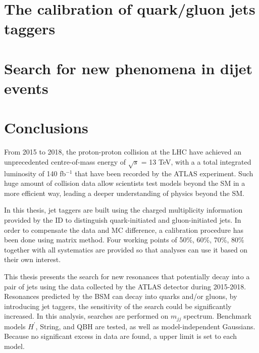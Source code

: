 \documentclass[UTF8,12pt]{ctexart}
\numberwithin{equation}{section}
\def\mjj{$m_{jj}$ }
\def\ifb{fb$^{-1}$ }
\def\Hprime{\ensuremath{H^\prime}}
\begin{document}
\newpage
{}
\section{The calibration of quark/gluon jets taggers}
\label{sec:5}



\newpage
{}
\section{Search for new phenomena in dijet events}
\label{sec:6}



\newpage
{}
\section{Conclusions}
\label{sec:7}

From 2015 to 2018, the proton-proton collision at the LHC have achieved an unprecedented centre-of-mass energy of $\sqrt{s}$ = 13 TeV, with a a total integrated luminosity of 140 \ifb that have been recorded by the ATLAS experiment. Such huge amount of collision data allow scientists test models beyond the SM in a more efficient way, leading a deeper understanding of physics beyond the SM.

In this thesis, jet taggers are built using the charged multiplicity information provided by the ID to distinguish quark-initiated and gluon-initiated jets. In order to compensate the data and MC difference, a calibration procedure has been done using matrix method. Four working points of 50\%, 60\%, 70\%, 80\% together with all systematics are provided so that analyses can use it based on their own interest.

This thesis presents the search for new resonances that potentially decay into a pair of jets using the data collected by the ATLAS detector during 2015-2018. Resonances predicted by the BSM can decay into quarks and/or gluons, by introducing jet taggers, the sensitivity of the search could be significantly increased. In this analysis, searches are performed on \mjj spectrum. Benchmark models \Hprime, String, and QBH are tested, as well as model-independent Gaussians. Because no significant excess in data are found, a upper limit is set to each model.




\newpage
{}
{}
\renewcommand\refname{REFERENCES}
\end{document}
